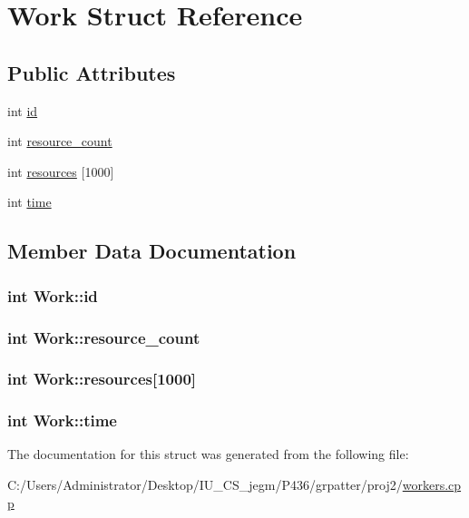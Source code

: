 \hypertarget{struct_work}{
\section{Work Struct Reference}
\label{struct_work}
}
\subsection*{Public Attributes}
\begin{DoxyCompactItemize}
\item 
int \hyperlink{struct_work_aa89c8a4dfa8964101aee45e97c45ca9c}{id}
\item 
int \hyperlink{struct_work_a6a2fc71de6d29336e7938eabc2402afb}{resource\_\-count}
\item 
int \hyperlink{struct_work_aa6fd470e426ebcce7ee26393da0d832f}{resources} \mbox{[}1000\mbox{]}
\item 
int \hyperlink{struct_work_a54424ff2a802b743d4850f9c902ffb57}{time}
\end{DoxyCompactItemize}


\subsection{Member Data Documentation}
\hypertarget{struct_work_aa89c8a4dfa8964101aee45e97c45ca9c}{
\subsubsection[{id}]{\setlength{\rightskip}{0pt plus 5cm}int {\bf Work::id}}}
\label{struct_work_aa89c8a4dfa8964101aee45e97c45ca9c}
\hypertarget{struct_work_a6a2fc71de6d29336e7938eabc2402afb}{
\subsubsection[{resource\_\-count}]{\setlength{\rightskip}{0pt plus 5cm}int {\bf Work::resource\_\-count}}}
\label{struct_work_a6a2fc71de6d29336e7938eabc2402afb}
\hypertarget{struct_work_aa6fd470e426ebcce7ee26393da0d832f}{
\subsubsection[{resources}]{\setlength{\rightskip}{0pt plus 5cm}int {\bf Work::resources}\mbox{[}1000\mbox{]}}}
\label{struct_work_aa6fd470e426ebcce7ee26393da0d832f}
\hypertarget{struct_work_a54424ff2a802b743d4850f9c902ffb57}{
\subsubsection[{time}]{\setlength{\rightskip}{0pt plus 5cm}int {\bf Work::time}}}
\label{struct_work_a54424ff2a802b743d4850f9c902ffb57}


The documentation for this struct was generated from the following file:\begin{DoxyCompactItemize}
\item 
C:/Users/Administrator/Desktop/IU\_\-CS\_\-jegm/P436/grpatter/proj2/\hyperlink{workers_8cpp}{workers.cpp}\end{DoxyCompactItemize}
